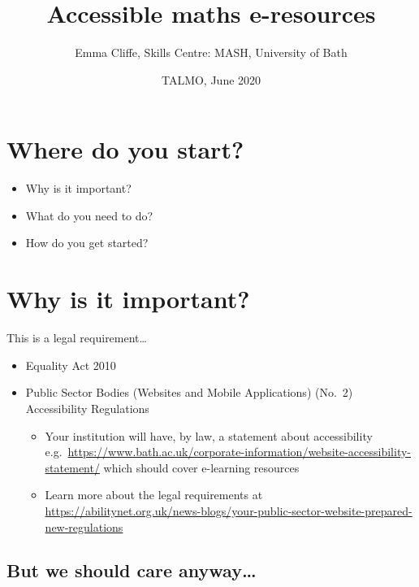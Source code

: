 \documentclass[
  17pt,
  english,
  a4paper]{extarticle}
\title{Accessible maths e-resources}
\author{Emma Cliffe, Skills Centre: MASH, University of Bath}
\date{TALMO, June 2020}
\providecommand{\tightlist}{%
  \setlength{\itemsep}{0pt}\setlength{\parskip}{0pt}}
\theoremstyle{plain}
\theoremstyle{plain}
\theoremstyle{plain}
\theoremstyle{plain}
\theoremstyle{plain}
\theoremstyle{definition}
\theoremstyle{definition}
\theoremstyle{definition}
\theoremstyle{remark}
\renewcommand{\;}{\,}
\begin{document}
\maketitle

{
\setcounter{tocdepth}{2}
\tableofcontents
}
\newpage
{}

\hypertarget{where-do-you-start}{%
\section*{Where do you start?}\label{where-do-you-start}}

\begin{itemize}
\tightlist
\item
  Why is it important?
\item
  What do you need to do?
\item
  How do you get started?
\end{itemize}

\hypertarget{why-is-it-important}{%
\section{Why is it important?}\label{why-is-it-important}}

This is a legal requirement\ldots{}

\begin{itemize}
\tightlist
\item
  Equality Act 2010
\item
  Public Sector Bodies (Websites and Mobile Applications) (No.~2) Accessibility Regulations

  \begin{itemize}
  \tightlist
  \item
    Your institution will have, by law, a statement about accessibility e.g.~\url{https://www.bath.ac.uk/corporate-information/website-accessibility-statement/} which should cover e-learning resources\\
  \item
    Learn more about the legal requirements at \url{https://abilitynet.org.uk/news-blogs/your-public-sector-website-prepared-new-regulations}
  \end{itemize}
\end{itemize}

\hypertarget{but-we-should-care-anyway}{%
\subsection{But we should care anyway\ldots{}}\label{but-we-should-care-anyway}}
\end{document}
